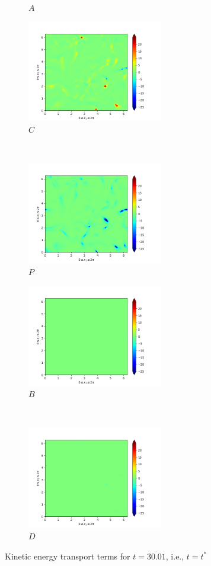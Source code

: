 \begin{figure}[H]
\begin{subfigure}{0.45\textwidth}
        \caption{$A$}
    \end{subfigure}
    \newline
    \begin{subfigure}{0.45\textwidth}
        \includegraphics[height=1.75in]{media/run-cds-65/C-ke-1340.png}
        \caption{$C$}
    \end{subfigure}
    ~
    \begin{subfigure}{0.45\textwidth}
        \includegraphics[height=1.75in]{media/run-cds-65/P-ke-1340.png}
        \caption{$P$}
    \end{subfigure}
    \newline
    \begin{subfigure}{0.45\textwidth}
        \includegraphics[height=1.75in]{media/run-cds-65/B-ke-1340.png}
        \caption{$B$}
    \end{subfigure}
    ~
    \begin{subfigure}{0.45\textwidth}
        \includegraphics[height=1.75in]{media/run-cds-65/D-ke-1340.png}
        \caption{$D$}
    \end{subfigure}
    \caption{Kinetic energy transport terms for $t=30.01$, i.e., $t=t^{\ast} $}
\end{figure}
